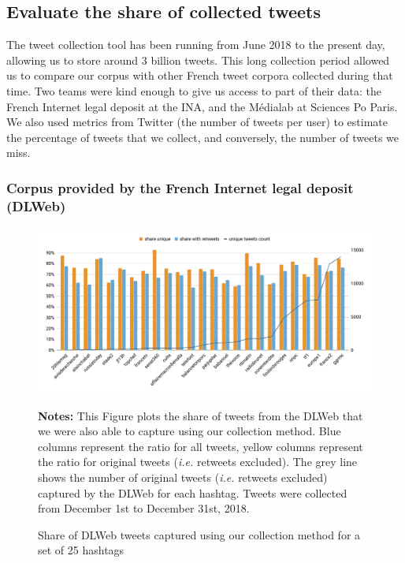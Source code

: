 \subsection{Evaluate the share of collected tweets}

The tweet collection tool has been running from June 2018 to the present day, allowing us to store around 3 billion tweets. This long collection period allowed us to compare our corpus with other French tweet corpora collected during that time. Two teams were kind enough to give us access to part of their data: the French Internet legal deposit at the INA, and the Médialab at Sciences Po Paris. We also used metrics from Twitter (the number of tweets per user) to estimate the percentage of tweets that we collect, and conversely, the number of tweets we miss.

\subsubsection{Corpus provided by the French Internet legal deposit (DLWeb)}
\begin{figure}
\begin{center}
\includegraphics[width=1\textwidth]{figures/ShareinCommonWithDL.pdf}
\end{center}
\scriptsize \textbf{Notes:} This Figure plots the share of tweets from the DLWeb that we were also able to capture using our collection method. Blue columns represent the ratio for all tweets, yellow columns represent the ratio for original tweets (\textit{i.e.} retweets excluded). The grey line shows the number of original tweets (\textit{i.e.} retweets excluded) captured by the DLWeb for each hashtag. Tweets were collected from December 1st to December 31st, 2018.

\caption{Share of DLWeb tweets captured using our collection method for a set of 25 hashtags}
\label{Figure:HistogramHashtagsDLWeb}
\end{figure}


